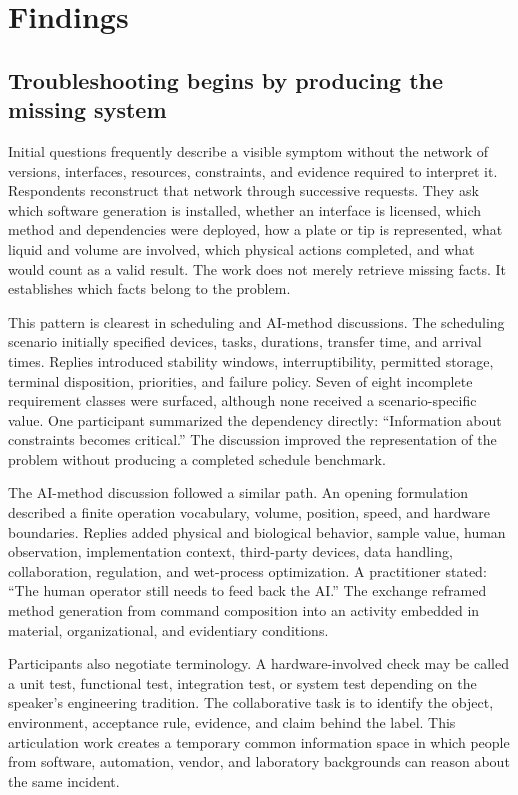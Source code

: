 \section{Findings}

\subsection{Troubleshooting begins by producing the missing system}

Initial questions frequently describe a visible symptom without the network of versions, interfaces, resources, constraints, and evidence required to interpret it. Respondents reconstruct that network through successive requests. They ask which software generation is installed, whether an interface is licensed, which method and dependencies were deployed, how a plate or tip is represented, what liquid and volume are involved, which physical actions completed, and what would count as a valid result. The work does not merely retrieve missing facts. It establishes which facts belong to the problem.

This pattern is clearest in scheduling and AI-method discussions. The scheduling scenario initially specified devices, tasks, durations, transfer time, and arrival times. Replies introduced stability windows, interruptibility, permitted storage, terminal disposition, priorities, and failure policy. Seven of eight incomplete requirement classes were surfaced, although none received a scenario-specific value. One participant summarized the dependency directly: ``Information about constraints becomes critical.'' \cite{forum_scheduling_toy} The discussion improved the representation of the problem without producing a completed schedule benchmark.

The AI-method discussion followed a similar path. An opening formulation described a finite operation vocabulary, volume, position, speed, and hardware boundaries. Replies added physical and biological behavior, sample value, human observation, implementation context, third-party devices, data handling, collaboration, regulation, and wet-process optimization. A practitioner stated: ``The human operator still needs to feed back the AI.'' \cite{forum_ai_method} The exchange reframed method generation from command composition into an activity embedded in material, organizational, and evidentiary conditions.

Participants also negotiate terminology. A hardware-involved check may be called a unit test, functional test, integration test, or system test depending on the speaker's engineering tradition. The collaborative task is to identify the object, environment, acceptance rule, evidence, and claim behind the label. This articulation work creates a temporary common information space in which people from software, automation, vendor, and laboratory backgrounds can reason about the same incident.

